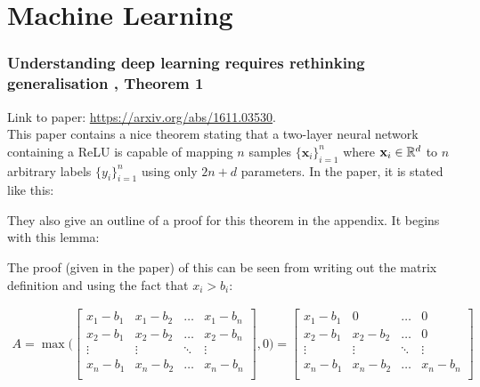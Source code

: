 \chapter{Machine Learning} \label{chap:ml}

\subsection{Understanding deep learning requires rethinking generalisation \cite{zhang2016understanding}, Theorem 1}

Link to paper: \url{https://arxiv.org/abs/1611.03530}. \\

This paper contains a nice theorem stating that a two-layer neural network containing a ReLU is capable of mapping $n$ samples $\{\mathbf{x}_i\}_{i=1}^n$ where $\mathbf{x}_i \in \mathbb{R}^d$ to $n$ arbitrary labels $\{y_i\}_{i=1}^n$ using only $2n + d$ parameters.  In the paper, it is stated like this:


They also give an outline of a proof for this theorem in the appendix. It begins with this lemma:


The proof (given in the paper) of this can be seen from writing out the matrix definition and using the fact that $x_i > b_i$:

\begin{align}
A = \max \Bigg(
\begin{bmatrix}
  x_1 - b_1 & x_1 - b_2 & \hdots & x_1 - b_n \\
  x_2 - b_1 & x_2 - b_2 & \hdots & x_2 - b_n \\
  \vdots & \vdots & \ddots & \vdots \\
  x_n - b_1 & x_n - b_2 & \hdots & x_n - b_n \\
\end{bmatrix}
, 0 \Bigg) = 
\begin{bmatrix}
  x_1 - b_1 & 0 & \hdots & 0 \\
  x_2 - b_1 & x_2 - b_2 & \hdots & 0 \\
  \vdots & \vdots & \ddots & \vdots \\
  x_n - b_1 & x_n - b_2 & \hdots & x_n - b_n \\
\end{bmatrix}
\end{align}

